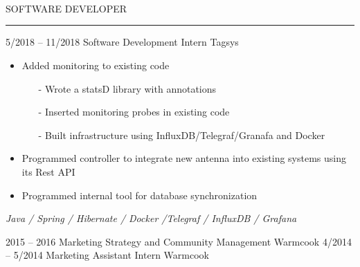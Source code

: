 \documentclass[10pt]{cv}
\begin{document}
\begin{minipage}[t]{0.82\textwidth}
  \vspace{-\baselineskip}
  \vspace{4ex}
  \begin{center}
  {}\\[1.5ex]

  \\[1ex]


  \\[1ex]
  \Large{SOFTWARE DEVELOPER}
  \end{center}
\end{minipage}
\begin{minipage}[t]{0.18\textwidth}
  \vspace{-\baselineskip}
  \vspace{5mm}
  \rule{2.8cm}{3.6cm}
\end{minipage}


\vspace{2mm}

\begin{entrylist}
  \entry
    {5/2018 -- 11/2018}
    {Software Development Intern}
    {Tagsys}
    {\vspace{-1ex}
      \begin{itemize}
        \item Added monitoring to existing code
        \begin{itemize}
            \item[-] Wrote a statsD library with annotations
            \item[-] Inserted monitoring probes in existing code
            \item[-] Built infrastructure using InfluxDB/Telegraf/Granafa and Docker
          \end{itemize}
          \item Programmed controller to integrate new antenna into existing systems using its Rest API
          \item Programmed internal tool for database synchronization\\
      \end{itemize}
      \vspace{-1ex}
      \textit{Java / Spring / Hibernate / Docker /Telegraf / InfluxDB / Grafana}}
  \smallentry
    {2015 -- 2016}
    {Marketing Strategy and Community Management}
    {Warmcook}
  \smallentry
    {4/2014 -- 5/2014}
    {Marketing Assistant Intern}
    {Warmcook}
\end{entrylist}
\end{document}
